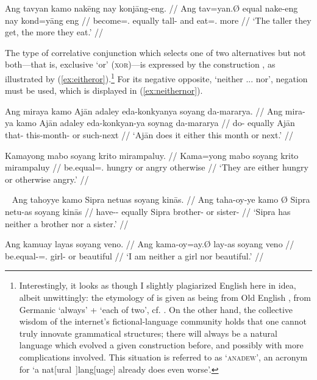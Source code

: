 \ex\label{ex:thethe}
\begingl
	\gla Ang tavyan kamo nakēng nay konjāng-eng. //
	\glb Ang tav=yan.Ø equal nake-eng nay {kond=yāng eng} //
	\glc \AgtT{} become=\TsgM{}.\Top{} equally tall-\Comp{} and 
		{eat=\TsgM{}.\Aarg{} more} //
	\glft `The taller they get, the more they eat.' //
\endgl
\xe



The type of correlative conjunction which selects one of two alternatives but
not both---that is, exclusive `or' (\textsc{xor})---is expressed by the
construction , as illustrated
by (\ref{ex:eitheror}).\footnote{Interestingly, it looks as though I slightly
plagiarized English here in idea, albeit unwittingly: the etymology of
 is given as being from Old English , from
Germanic  `always' +  `each of two', cf.
\citet[either, adj. (and pron.) and adv. (and conj.)]{oed}. On the other hand,
the collective wisdom of the internet's fictional-language community holds that
one cannot truly innovate grammatical structures; there will always be a
natural language which evolved a given construction before, and possibly with
more complications involved. This situation is referred to as
`\textsc{anadew}', an acronym for `a nat[ural~]lang[uage] already does even
worse'.} For its negative opposite, `neither ... nor', negation must be used,
which is displayed in (\ref{ex:neithernor}).

\pex\label{ex:eitheror}
\a\label{ex:eitherorvb}\begingl
	\gla Ang miraya kamo Ajān adaley eda-konkyanya soyang da-mararya. //
	\glb Ang mira-ya kamo Ajān adaley eda-konkyan-ya soynag da-mararya //
	\glc \AgtT{} do-\TsgM{} equally Ajān that-\PargI{} this-month-\Loc{} 
		or such-next //
	\glft `Ajān does it either this month or next.' //
\endgl

\a\label{ex:eitherorpred}\begingl
	\gla Kamayong mabo soyang krito mirampaluy. //
	\glb Kama=yong mabo soyang krito mirampaluy //
	\glc be.equal=\TsgN{}.\Aarg{} hungry or angry otherwise //
	\glft `They are either hungry or otherwise angry.' //
\endgl

\xe

\pex~\label{ex:neithernor}
\a\label{ex:neithernorvb}\begingl
	\gla Ang tahoyye kamo {} Sipra netuas soyang kinās. //
	\glb Ang taha-oy-ye kamo Ø Sipra netu-as soyang kinās //
	\glc \AgtT{} have-\Neg{}-\TsgF{} equally \Top{} Sipra brother-\Parg{} 
		or sister-\Parg{} //
	\glft `Sipra has neither a brother nor a sister.' //
\endgl

\a\label{ex:neithernorpred}\begingl
	\gla Ang kamuay layas soyang veno. //
	\glb Ang kama-oy=ay.Ø lay-as soyang veno //
	\glc \AgtT{} be.equal-\Neg{}=\Fsg{}.\Aarg{} girl-\Parg{} or beautiful //
	\glft `I am neither a girl nor beautiful.' //
\endgl

\xe


